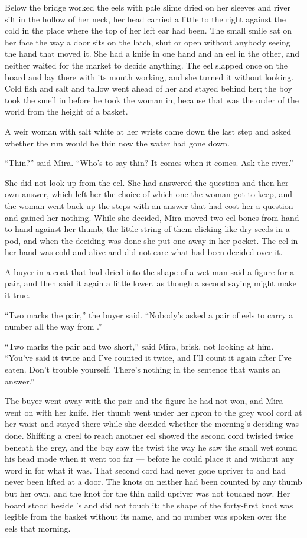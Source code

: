 Below the bridge  worked the eels with pale slime dried on her sleeves and river silt in the hollow of her neck, her head carried a little to the right against the cold in the place where the top of her left ear had been. The small smile sat on her face the way a door sits on the latch, shut or open without anybody seeing the hand that moved it. She had a knife in one hand and an eel in the other, and neither waited for the market to decide anything. The eel slapped once on the board and lay there with its mouth working, and she turned it without looking. Cold fish and salt and tallow went ahead of her and stayed behind her; the boy took the smell in before he took the woman in, because that was the order of the world from the height of a basket.

A weir woman with salt white at her wrists came down the last step and asked whether the run would be thin now the water had gone down.

“Thin?” said Mira. “Who's to say thin? It comes when it comes. Ask the river.”

She did not look up from the eel. She had answered the question and then her own answer, which left her the choice of which one the woman got to keep, and the woman went back up the steps with an answer that had cost her a question and gained her nothing. While she decided, Mira moved two eel-bones from hand to hand against her thumb, the little string of them clicking like dry seeds in a pod, and when the deciding was done she put one away in her pocket. The eel in her hand was cold and alive and did not care what had been decided over it.

A buyer in a coat that had dried into the shape of a wet man said a figure for a pair, and then said it again a little lower, as though a second saying might make it true.

“Two marks the pair,” the buyer said. “Nobody's asked a pair of eels to carry a number all the way from .”

“Two marks the pair and two short,” said Mira, brisk, not looking at him. “You've said it twice and I've counted it twice, and I'll count it again after I've eaten. Don't trouble yourself. There's nothing in the sentence that wants an answer.”

The buyer went away with the pair and the figure he had not won, and Mira went on with her knife. Her thumb went under her apron to the grey wool cord at her waist and stayed there while she decided whether the morning's deciding was done. Shifting a creel to reach another eel showed the second cord twisted twice beneath the grey, and the boy saw the twist the way he saw the small wet sound his head made when it went too far — before he could place it and without any word in  for what it was. That second cord had never gone upriver to  and had never been lifted at a door. The knots on neither had been counted by any thumb but her own, and the knot for the thin child upriver was not touched now. Her board stood beside 's  and did not touch it; the shape of the forty-first knot was legible from the basket without its name, and no number was spoken over the eels that morning.

